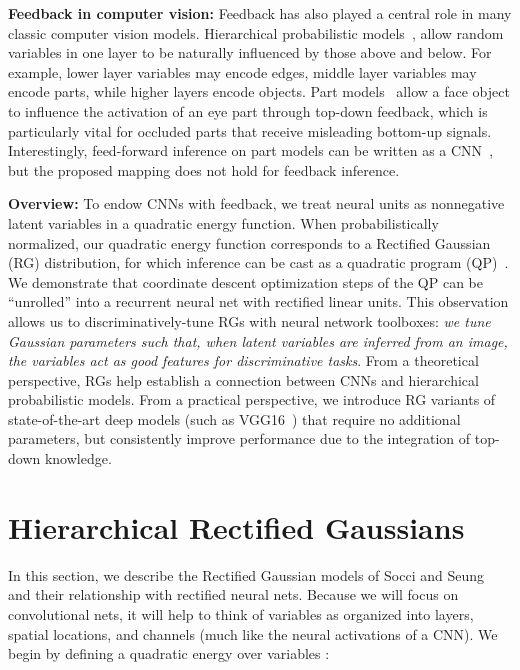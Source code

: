\documentclass[10pt,twocolumn,letterpaper]{article}
\begin{document}
{\bf Feedback in computer vision:} Feedback has also played a central
role in many classic computer vision models. Hierarchical
probabilistic models~\cite{zhu2011recursive, jin2006context,
  lee2003hierarchical}, allow random variables in one layer to be
naturally influenced by those above and below. For example, lower
layer variables may encode edges, middle layer variables may encode
parts, while higher layers encode objects. Part
models~\cite{felzenszwalb2010object} allow a face object to influence
the activation of an eye part through top-down feedback, which is
particularly vital for occluded parts that receive misleading
bottom-up signals. Interestingly, feed-forward
inference on part models can be written as a
CNN~\cite{girshick2014deformable}, but the proposed mapping does not
hold for feedback inference. 

{\bf Overview:} To endow CNNs with feedback, we treat neural units as
nonnegative latent variables in a quadratic energy function. When
probabilistically normalized, our quadratic energy function
corresponds to a Rectified Gaussian (RG) distribution, for which
inference can be cast as a quadratic program
(QP)~\cite{socci1998rectified}. We demonstrate that coordinate descent
optimization steps of the QP can be ``unrolled'' into a recurrent
neural net with rectified linear units. This observation allows us to
discriminatively-tune RGs with neural network toolboxes: {\em we tune
  Gaussian parameters such that, when latent variables are inferred
  from an image, the variables act as good features for discriminative
  tasks}. From a theoretical perspective, RGs help establish a
connection between CNNs and hierarchical probabilistic models. From a
practical perspective, we introduce RG variants of state-of-the-art
deep models (such as VGG16~\cite{simonyan2014very}) that require no
additional parameters, but consistently improve performance due to the
integration of top-down knowledge.

\section{Hierarchical Rectified Gaussians} \label{sec:lvm} In this
section, we describe the Rectified Gaussian models of Socci and
Seung~\cite{socci1998rectified} and their relationship with rectified
neural nets. Because we will focus on convolutional nets, it will help
to think of variables  as organized into layers, spatial
locations, and channels (much like the neural activations of a CNN).
We begin by defining a quadratic energy over variables
:
\end{document}
